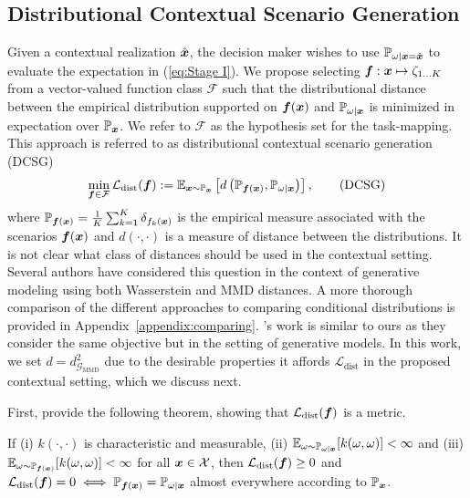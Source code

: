 \subsection{Distributional Contextual Scenario Generation}\label{subsection:DCSG}


Given a contextual realization $\hat{\boldsymbol{x}}$, the decision maker wishes to use $\mathbb{P}_{\omega | \boldsymbol{x} = \hat{\boldsymbol{x}}}$ to evaluate the expectation in (\ref{eq:Stage I}). We propose selecting $\boldsymbol{f}: \boldsymbol{x} \mapsto \zeta_{1...K}$ from a vector-valued function class $\mathcal{F}$ such that the distributional distance between the empirical distribution supported on $\boldsymbol{f}(\boldsymbol{x})$ and $\mathbb{P}_{\omega|\boldsymbol{x}}$ is minimized in expectation over $\mathbb{P}_{\boldsymbol{x}}$. We refer to $\mathcal{F}$ as the hypothesis set for the task-mapping. This approach is referred to as distributional contextual scenario generation (DCSG)
\begin{equation}\label{eq:DCSG}
\min_{\boldsymbol{f} \in \mathcal{F}} \mathcal{L}_{\text{dist}}(\boldsymbol{f}) := \mathbb{E}_{\boldsymbol{x} \sim \mathbb{P}_{\boldsymbol{x}}} \left[ d \left( \mathbb{P}_{\boldsymbol{f}(\boldsymbol{x})}, \mathbb{P}_{\omega |\boldsymbol{x}} \right) \right], \tag{DCSG}
\end{equation}
where $\mathbb{P}_{\boldsymbol{f}(\boldsymbol{x})} = \frac{1}{K} \sum_{k=1}^K \delta_{f_k(\boldsymbol{x})}$ is the empirical measure associated with the scenarios $\boldsymbol{f}(\boldsymbol{x})$ and $d(\cdot,\cdot )$ is a measure of distance between the distributions. It is not clear what class of distances should be used in the contextual setting. Several authors have considered this question in the context of generative modeling using both Wasserstein and MMD distances. A more thorough comparison of the different approaches to comparing conditional distributions is provided in \hbox{Appendix \ref{appendix:comparing}}. \citet{huang2022evaluating}'s work is similar to ours as they consider the same objective but in the setting of generative models. In this work, we set $d = d^2_{\mathcal{G}_{\text{MMD}}}$ due to the desirable properties it affords $\mathcal{L}_{\text{dist}}$ in the proposed contextual setting, which we discuss next. 

First, \citet{huang2022evaluating} provide the following theorem, showing that $\mathcal{L}_{\text{dist}}(\boldsymbol{f})$ is a metric. 
\begin{theorem}\label{prop:metric}
 If (i) $k(\cdot,\cdot )$ is characteristic and measurable, (ii) $\mathbb{E}_{\omega \sim \mathbb{P}_{\omega|\boldsymbol{x}}}[k(\omega, \omega)] < \infty$ and (iii) $\mathbb{E}_{\omega \sim \mathbb{P}_{\boldsymbol{f}(\boldsymbol{x})}}[k(\omega, \omega)] < \infty$ for all $\boldsymbol{x} \in \mathcal{X}$, then $\mathcal{L}_{\text{dist}}(\boldsymbol{f}) \geq 0$ and $\mathcal{L}_{\text{dist}}(\boldsymbol{f}) = 0 \iff\mathbb{P}_{\boldsymbol{f}(\boldsymbol{x})} = \mathbb{P}_{\omega|\boldsymbol{x}}$ almost everywhere according to $\mathbb{P}_{\boldsymbol{x}}$. 
\end{theorem}



